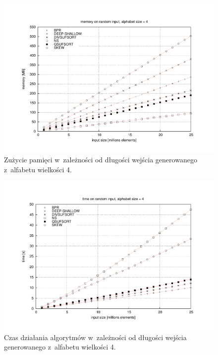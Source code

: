 \begin{figure}[tp]
    \begin{center}
          \includegraphics[width=\linewidth]{figures/results/random-input-memory-4}
    \end{center}
    \caption{Zużycie pamięci w~zależności od długości wejścia generowanego z~alfabetu wielkości 4.}%
    \label{rys:random-input-memory-4}
\end{figure}

\begin{figure}[tp]
       \begin{center}
            \includegraphics[width=\linewidth]{figures/results/random-input-time-4.pdf}
        \end{center}        
    \caption{Czas działania algorytmów w~zależności od długości wejścia generowanego z~alfabetu wielkości 4.}%
    \label{rys:random-input-time-4}
\end{figure}

